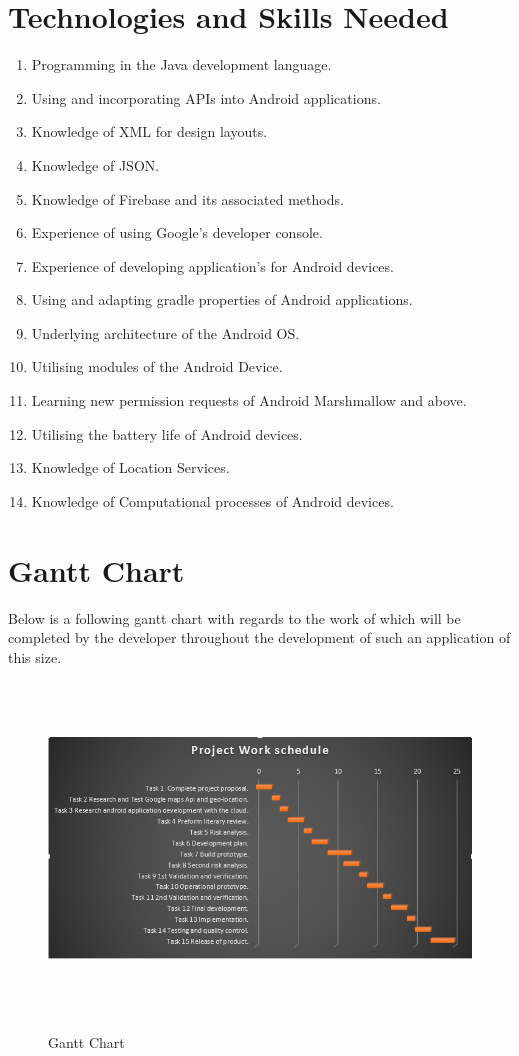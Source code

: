 \section{Technologies and Skills Needed}
\begin{enumerate}
	\item Programming  in the Java development language.
	\item Using and incorporating APIs into Android applications.
	\item Knowledge of XML for design layouts.
	\item Knowledge of JSON.
	\item Knowledge of Firebase and its associated methods.
	\item Experience of using Google's developer console.
	\item Experience of developing application's for Android devices.
	\item Using and adapting gradle properties of Android applications.
	\item Underlying architecture of the Android OS.
	\item Utilising modules of the Android Device.
	\item Learning new permission requests of Android Marshmallow and above.
	\item Utilising the battery life of Android devices.
	\item Knowledge of Location Services.
	\item Knowledge of Computational processes of Android devices.
\end{enumerate}

\section{Gantt Chart}
Below is a following gantt chart with regards to the work of which will be completed by the developer throughout the development of such an application of this size.
\begin{figure}[!ht]
	\center \includegraphics[width=420pt, height=250pt]{ganntChart}\\
	\caption{Gantt Chart} \label{Figure: Gantt Chart of work breakdown structure.  
		Area}
\end{figure}

